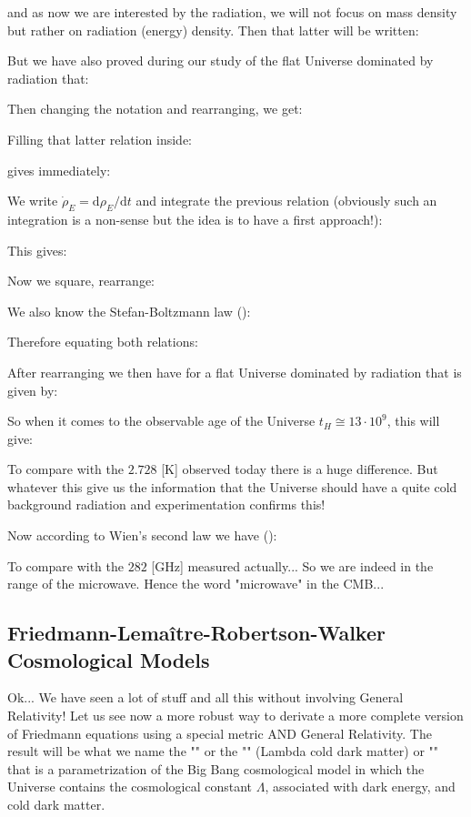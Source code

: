 	and as now we are interested by the radiation, we will not focus on mass density but rather on radiation (energy) density. Then that latter will be written:
	
	But we have also proved during our study of the flat Universe dominated by radiation that:
	
	Then changing the notation and rearranging, we get:
	
	Filling that latter relation inside:
	
	gives immediately:
	
	We write $\dot{\rho}_E=\mathrm{d}\rho_E/\mathrm{d}t$ and integrate the previous relation (obviously such an integration is a non-sense but the idea is to have a first approach!):
	
	This gives:
	
	Now we square, rearrange:
	
	We also know the Stefan-Boltzmann law ():
	
	Therefore equating both relations:
	
	After rearranging we then have for a flat Universe dominated by radiation that is given by:
	
	So when it comes to the observable age of the Universe $t_H\cong 13\cdot 10^9$, this will give:
	
	To compare with the $2.728$ [K] observed today there is a huge difference. But whatever this give us the information that the Universe should have a quite cold background radiation and experimentation confirms this!
	
	Now according to Wien's second law we have ():
	
	To compare with the $282$ [GHz] measured actually... So we are indeed in the range of the microwave. Hence the word "microwave" in the CMB...
	
	\pagebreak
	\subsection{Friedmann-Lemaître-Robertson-Walker Cosmological Models}\label{Friedmann-Lemaître-Robertson-Walker Cosmological Models}
	Ok... We have seen a lot of stuff and all this without involving General Relativity! Let us see now a more robust way to derivate a more complete version of Friedmann equations using a special metric AND General Relativity. The result will be what we name the "" or the "" (Lambda cold dark matter) or "" that is a parametrization of the Big Bang cosmological model in which the Universe contains the cosmological constant $\Lambda$, associated with dark energy, and cold dark matter.
	
